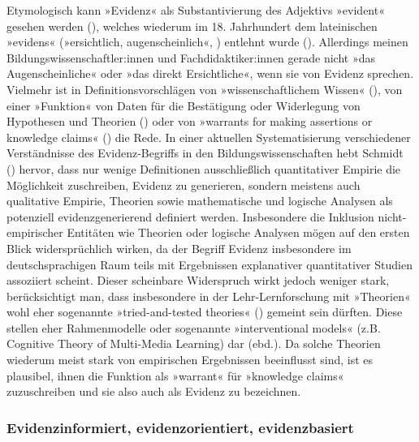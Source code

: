 \documentclass[
  jou,
  floatsintext,
  longtable,
  nolmodern,
  notxfonts,
  notimes,
  colorlinks=true,linkcolor=blue,citecolor=blue,urlcolor=blue]{apa7}
\begin{document}
Etymologisch kann »Evidenz« als Substantivierung des Adjektivs »evident«
gesehen werden (), welches
wiederum im 18. Jahrhundert dem lateinischen »evidens« (»ersichtlich,
augenscheinlich«, ) entlehnt
wurde (). Allerdings meinen
Bildungswissenschaftler:innen und Fachdidaktiker:innen gerade nicht »das
Augenscheinliche« oder »das direkt Ersichtliche«, wenn sie von Evidenz
sprechen. Vielmehr ist in Definitionsvorschlägen von »wissenschaftlichem
Wissen« (), von einer »Funktion«
von Daten für die Bestätigung oder Widerlegung von Hypothesen und
Theorien () oder von
»warrants for making assertions or knowledge claims«
() die
Rede. In einer aktuellen Systematisierung verschiedener Verständnisse
des Evidenz-Begriffs in den Bildungswissenschaften hebt Schmidt
() hervor, dass nur wenige Definitionen
ausschließlich quantitativer Empirie die Möglichkeit zuschreiben,
Evidenz zu generieren, sondern meistens auch qualitative Empirie,
Theorien sowie mathematische und logische Analysen als potenziell
evidenzgenerierend definiert werden. Insbesondere die Inklusion
nicht-empirischer Entitäten wie Theorien oder logische Analysen mögen
auf den ersten Blick widersprüchlich wirken, da der Begriff Evidenz
insbesondere im deutschsprachigen Raum teils mit Ergebnissen
explanativer quantitativer Studien assoziiert scheint. Dieser scheinbare
Widerspruch wirkt jedoch weniger stark, berücksichtigt man, dass
insbesondere in der Lehr-Lernforschung mit »Theorien« wohl eher
sogenannte »tried-and-tested theories« () gemeint sein dürften. Diese stellen eher Rahmenmodelle oder
sogenannte »interventional models« (z.B. Cognitive Theory of Multi-Media
Learning) dar (ebd.). Da solche Theorien wiederum meist stark von
empirischen Ergebnissen beeinflusst sind, ist es plausibel, ihnen die
Funktion als »warrant« für »knowledge claims« zuzuschreiben und sie also
auch als Evidenz zu bezeichnen.

\subsubsection{Evidenzinformiert, evidenzorientiert,
evidenzbasiert}\label{evidenzinformiert-evidenzorientiert-evidenzbasiert}
\end{document}
